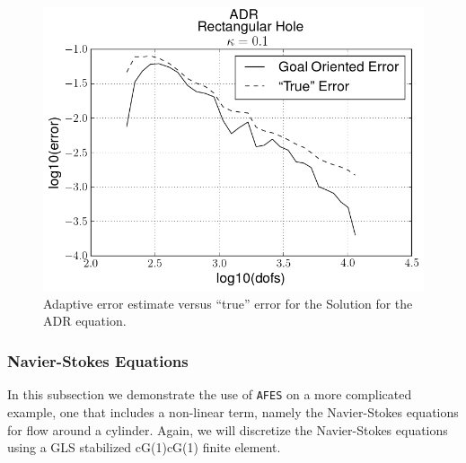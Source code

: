     
    
    \begin{figure}[H]
        \centering
        \includegraphics[scale=0.5]{Figures/AdaptiveADRkappa1E-1.png}
        \caption{Adaptive error estimate versus ``true'' error for the Solution
            for the ADR equation.}
        \label{fig:ADR_err}
    \end{figure}

\subsubsection{Navier-Stokes Equations} \label{sss:NSE}

    In this subsection we demonstrate the use of \texttt{AFES} on a more complicated
    example, one that includes a non-linear term, namely the Navier-Stokes
    equations for flow around a cylinder.  Again, we will discretize the
    Navier-Stokes equations using a GLS stabilized cG(1)cG(1) finite element.

